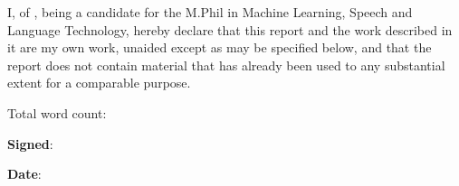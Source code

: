 
\makeatletter
\begin{declaration}

I, \@author{} of \@college{}, being a candidate for the M.Phil in Machine Learning,
Speech and Language Technology, hereby declare that this report and the work
described in it are my own work, unaided except as may be specified below, and
that the report does not contain material that has already been used to any
substantial extent for a comparable purpose.

\vspace{24pt}
Total word count: \wordcount

\vspace{60pt}
\textbf{Signed}:

\vspace{24pt}
\textbf{Date}:
\vspace{60pt}


\end{declaration}
\makeatother
